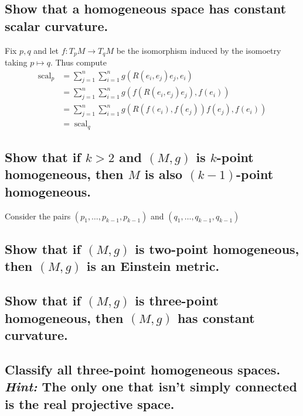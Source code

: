 \documentclass[10pt]{article}
\DeclareMathOperator{\scal}{scal}
\DeclareMathOperator{\2}{II}
\newcommand{\hint}[1]{{\emph{Hint:} #1}} %
\begin{document}
\subsection{Show that a homogeneous space has constant scalar curvature.}
Fix $p,q$ and let $f: T_p M \to T_q M$ be the isomorphism induced by the isomoetry taking $p \mapsto q$. Thus compute
\begin{align*}
	\scal_p &= \sum_{j=1}^n \sum_{i=1}^n g(R(e_i, e_j) e_j, e_i)\\
	 &= \sum_{j=1}^n \sum_{i=1}^n g( f( R(e_i, e_j) e_j) , f(e_i))\\
 	 &= \sum_{j=1}^n \sum_{i=1}^n g(  R(f(e_i), f(e_j))  f(e_j) , f(e_i))\\
	 &= \scal_q
\end{align*}
\subsection{Show that if $k > 2$ and $(M,g)$ is $k$-point homogeneous, then $M$ is also $(k-1)$-point homogeneous.}
Consider the pairs $(p_1, \dots, p_{k-1},  p_{k-1})$ and $(q_1, \dots, q_{k-1}, q_{k-1})$ 
\subsection{Show that if $(M,g)$ is two-point homogeneous, then $(M,g)$ is an Einstein metric.}
\subsection{Show that if $(M,g)$ is three-point homogeneous, then $(M,g)$ has constant curvature.}
\subsection{Classify all three-point homogeneous spaces. \hint{The only one that isn't simply connected is the real projective space.}}
\end{document}
